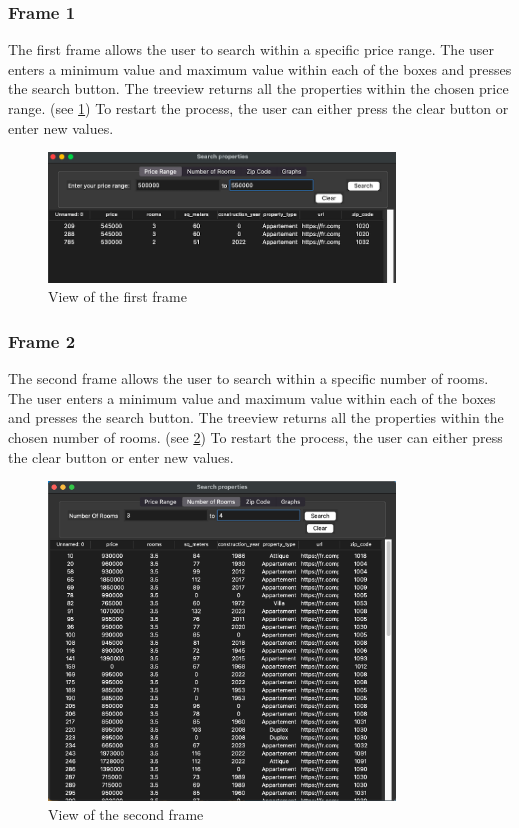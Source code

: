 \documentclass[main]{subfiles}
\begin{document}
\subsubsection{Frame 1}
The first frame allows the user to search within a specific price range. 
The user enters a minimum value and maximum value within each of the boxes and presses the search button. 
The treeview returns all the properties within the chosen price range. (see \ref{fig:frame1})
To restart the process, the user can either press the clear button or enter new values.

\begin{figure}[htbp]
    \centerline{
        \includegraphics[width = 92mm]{prog_8.png}}
    \caption{View of the first frame}
    \label{fig:frame1}
\end{figure}

\subsubsection{Frame 2}
The second frame allows the user to search within a specific number of rooms. 
The user enters a minimum value and maximum value within each of the boxes and presses the search button. 
The treeview returns all the properties within the chosen number of rooms. (see \ref{fig:frame2})
To restart the process, the user can either press the clear button or enter new values.

\begin{figure}[htbp]
    \centerline{
        \includegraphics[width = 92mm]{prog_9.png}}
    \caption{View of the second frame}
    \label{fig:frame2}
\end{figure}
\end{document}

